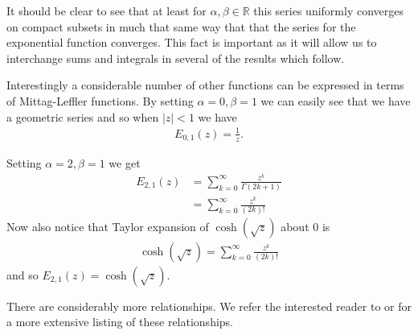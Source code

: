 It should be clear to see that at least for $ \alpha, \beta \in \mathbb{R} $ this series uniformly converges on compact subsets in much that same way that that the series for the exponential function converges. This fact is important as it will allow us to interchange sums and integrals in several of the results which follow.

Interestingly a considerable number of other functions can be expressed in terms of Mittag-Leffler functions. By setting $ \alpha = 0, \beta = 1 $ we can easily see that we have a geometric series and so when $ |z| < 1 $ we have
\begin{align*}
    E_{0,1}(z) = \frac{1}{z}.
\end{align*}

Setting $ \alpha = 2, \beta = 1 $ we get
\begin{align*}
    E_{2,1}(z) &= \sum_{k=0}^\infty \frac{z^k}{\Gamma(2k + 1)} \\
            &= \sum_{k=0}^\infty \frac{z^k}{(2k)!}
\end{align*}
Now also notice that Taylor expansion of $ \cosh(\sqrt{z}) $ about 0 is
\begin{align*}
    \cosh(\sqrt{z}) = \sum_{k=0}^\infty \frac{z^k}{(2k)!}
\end{align*}
and so $ E_{2,1}(z) = \cosh(\sqrt{z}) $. 

There are considerably more relationships. We refer the interested reader to \cite{Podlubny1999} or \cite{Samko1993} for a more extensive listing of these relationships.

